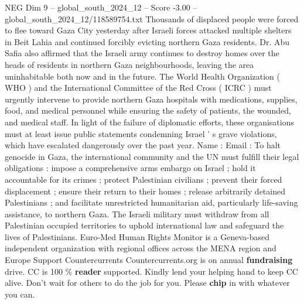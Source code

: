 \begin{textsample}{NEG Dim 9 – global\_south\_2024\_12 – Score -3.00 – global\_south\_2024\_12/118589754.txt}
Thousands of displaced people were forced to flee toward Gaza City yesterday after Israeli forces attacked multiple shelters in Beit Lahia and continued forcibly evicting northern Gaza residents.
Dr.
Abu Safia also affirmed that the Israeli army continues to destroy homes over the heads of residents in northern Gaza neighbourhoods, leaving the area uninhabitable both now and in the future.
The World Health Organization ( WHO ) and the International Committee of the Red Cross ( ICRC ) must urgently intervene to provide northern Gaza hospitals with medications, supplies, food, and medical personnel while ensuring the safety of patients, the wounded, and medical staff.
In light of the failure of diplomatic efforts, these organisations must at least issue public statements condemning Israel ' s grave violations, which have escalated dangerously over the past year.
Name : Email : To halt genocide in Gaza, the international community and the UN must fulfill their legal obligations : impose a comprehensive arms embargo on Israel ; hold it accountable for its crimes ; protect Palestinian civilians ; prevent their forced displacement ; ensure their return to their homes ; release arbitrarily detained Palestinians ; and facilitate unrestricted humanitarian aid, particularly life-saving assistance, to northern Gaza.
The Israeli military must withdraw from all Palestinian occupied territories to uphold international law and safeguard the lives of Palestinians.
Euro-Med Human Rights Monitor is a Geneva-based independent organization with regional offices across the MENA region and Europe Support Countercurrents Countercurrents.org is on annual \textbf{fundraising} drive.
CC is 100 \% \textbf{reader} supported.
Kindly lend your helping hand to keep CC alive.
Don't wait for others to do the job for you.
Please \textbf{chip} in with whatever you can.

\end{textsample}
